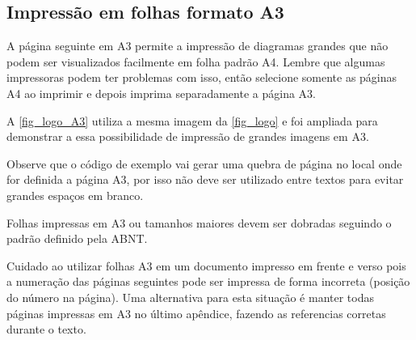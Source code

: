 
\subsection{Impressão em folhas formato A3}

A página seguinte em A3 permite a impressão de diagramas grandes que não podem ser visualizados facilmente em folha padrão A4. Lembre que algumas impressoras podem ter problemas com isso, então selecione somente as páginas A4 ao imprimir e depois imprima separadamente a página A3.

A \autoref{fig_logo_A3} utiliza a mesma imagem da \autoref{fig_logo} e foi ampliada para demonstrar a essa possibilidade de impressão de grandes imagens em A3.

Observe que o código de exemplo vai gerar uma quebra de página no local onde for definida a página A3, por isso não deve ser utilizado entre textos para evitar grandes espaços em branco.

Folhas impressas em A3 ou tamanhos maiores devem ser dobradas seguindo o padrão definido pela ABNT. 


Cuidado ao utilizar folhas A3 em um documento impresso em frente e verso pois a numeração das páginas seguintes pode ser impressa de forma incorreta (posição do número na página). Uma alternativa para esta situação é manter todas páginas impressas em A3 no último apêndice, fazendo as referencias corretas durante o texto.



